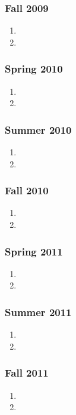 \begin{frame}
\frametitle{Fall 2009}
\begin{enumerate} 
\item \tiny 
\item \tiny 
\end{enumerate} 
\end{frame}


\begin{frame}
\frametitle{Spring 2010}
\begin{enumerate} 
\item \tiny 
\item \tiny 
\end{enumerate} 
\end{frame}


\begin{frame}
\frametitle{Summer 2010}
\begin{enumerate} 
\item \tiny 
\item \tiny 
\end{enumerate} 
\end{frame}


\begin{frame}
\frametitle{Fall 2010}
\begin{enumerate} 
\item \tiny 
\item \tiny 
\end{enumerate} 
\end{frame}



\begin{frame}
\frametitle{Spring 2011}
\begin{enumerate} 
\item \tiny 
\item \tiny 
\end{enumerate} 
\end{frame}


\begin{frame}
\frametitle{Summer 2011}
\begin{enumerate} 
\item \tiny 
\item \tiny 
\end{enumerate} 
\end{frame}


\begin{frame}
\frametitle{Fall 2011}
\begin{enumerate} 
\item \tiny 
\item \tiny 
\end{enumerate} 
\end{frame}

